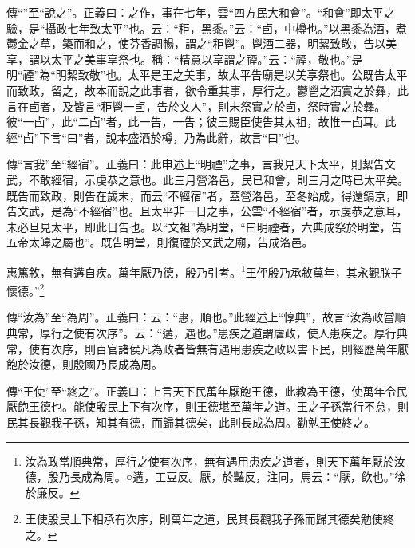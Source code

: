 {\noindent\zhuan{}\fzbyks 傳“”至“說之”。正義曰：之作，事在七年，雲“四方民大和會”。“和會”即太平之驗，是“攝政七年致太平”也。云：“秬，黑黍。”云：“卣，中樽也。”以黑黍為酒，煮鬱金之草，築而和之，使芬香調暢，謂之“秬鬯”。鬯酒二器，明絜致敬，告以美享，謂以太平之美事享祭也。稱：“精意以享謂之禋。”云：“禋，敬也。”是明“禋”為“明絜致敬”也。太平是王之美事，故太平告廟是以美享祭也。公既告太平而致政，留之，故本而說之此事者，欲令重其事，厚行之。鬱鬯之酒實之於彝，此言在卣者，及皆言“秬鬯一卣，告於文人”，則未祭實之於卣，祭時實之於彝。彼“一卣”，此“二卣”者，此一告，一告；彼王賜臣使告其太祖，故惟一卣耳。此經“卣”下言“曰”者，說本盛酒於樽，乃為此辭，故言“曰”也。 \par}

{\noindent\zhuan{}\fzbyks 傳“言我”至“經宿”。正義曰：此申述上“明禋”之事，言我見天下太平，則絜告文武，不敢經宿，示虔恭之意也。此三月營洛邑，民已和會，則三月之時已太平矣。既告而致政，則告在歲末，而云“不經宿”者，蓋營洛邑，至冬始成，得還鎬京，即告文武，是為“不經宿”也。且太平非一日之事，公雲“不經宿”者，示虔恭之意耳，未必旦見太平，即此日告也。以“文祖”為明堂，“曰明禋者，六典成祭於明堂，告五帝太皞之屬也”。既告明堂，則復禋於文武之廟，告成洛邑。 \par}

惠篤敘，無有遘自疾。萬年厭乃德，殷乃引考。\footnote{汝為政當順典常，厚行之使有次序，無有遇用患疾之道者，則天下萬年厭於汝德，殷乃長成為周。○遘，工豆反。厭，於豔反，注同，馬云：“厭，飲也。”徐於廉反。}王伻殷乃承敘萬年，其永觀朕子懷德。”\footnote{王使殷民上下相承有次序，則萬年之道，民其長觀我子孫而歸其德矣勉使終之。}

{\noindent\zhuan{}\fzbyks 傳“汝為”至“為周”。正義曰：云：“惠，順也。”此經述上“惇典”，故言“汝為政當順典常，厚行之使有次序”。云：“遘，遇也。”患疾之道謂虐政，使人患疾之。厚行典常，使有次序，則百官諸侯凡為政者皆無有遇用患疾之政以害下民，則經歷萬年厭飽於汝德，則殷國乃長成為周。 \par}

{\noindent\zhuan{}\fzbyks 傳“王使”至“終之”。正義曰：上言天下民萬年厭飽王德，此教為王德，使萬年令民厭飽王德也。能使殷民上下有次序，則王德堪至萬年之道。王之子孫當行不怠，則民其長觀我子孫，知其有德，而歸其德矣，此則長成為周。勸勉王使終之。 \par}

